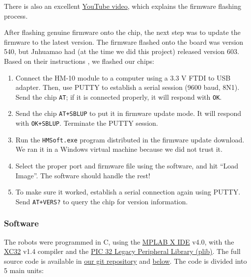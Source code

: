 \documentclass[]{article}
\providecommand{\tightlist}{%
  \setlength{\itemsep}{0pt}\setlength{\parskip}{0pt}}
\begin{document}
There is also an excellent
\href{https://www.youtube.com/watch?v=ez3491-v8Og}{YouTube video}, which
explains the firmware flashing process.

After flashing genuine firmware onto the chip, the next step was to
update the firmware to the latest version. The firmware flashed onto the
board was version 540, but Jnhuamao had (at the time we did this
project) released
version 603. \cite{jnhuamao603} Based on their instructions \cite{jnhuamaoinstructions}, we flashed our chips:

\begin{enumerate}
\def\labelenumi{\arabic{enumi}.}
\tightlist
\item
  Connect the HM-10 module to a computer using a 3.3 V FTDI to USB
  adapter. Then, use PUTTY to establish a serial session (9600 baud,
  8N1). Send the chip \texttt{AT}; if it is connected properly, it will
  respond with \texttt{OK}.
\item
  Send the chip \texttt{AT+SBLUP} to put it in firmware update mode. It
  will respond with \texttt{OK+SBLUP}. Terminate the PUTTY session.
\item
  Run the \texttt{HMSoft.exe} program distributed in the firmware update
  download. We ran it in a Windows virtual machine because we did not
  trust it.
\item
  Select the proper port and firmware file using the software, and hit
  ``Load Image''. The software should handle the rest!
\item
  To make sure it worked, establish a serial connection again using
  PUTTY. Send \texttt{AT+VERS?} to query the chip for version
  information.
\end{enumerate}

\hypertarget{software}{%
\subsubsection{Software}\label{software}}

The robots were programmed in C, using the
\href{http://www.microchip.com/mplab/mplab-x-ide}{MPLAB X IDE} v4.0,
with the \href{http://www.microchip.com/mplab/compilers}{XC32} v1.4
compiler and the
\href{http://www.microchip.com/SWLibraryWeb/product.aspx?product=PIC32\%20Peripheral\%20Library}{PIC
32 Legacy Peripheral Library (plib)}. The full source code is available
in
\href{https://github.com/orangeturtle739/bluehunters/tree/master/ble.X}{our
git repository} and
\protect\hyperlink{appendix-b-source-listing}{below}. The code is
divided into 5 main units:
\end{document}
